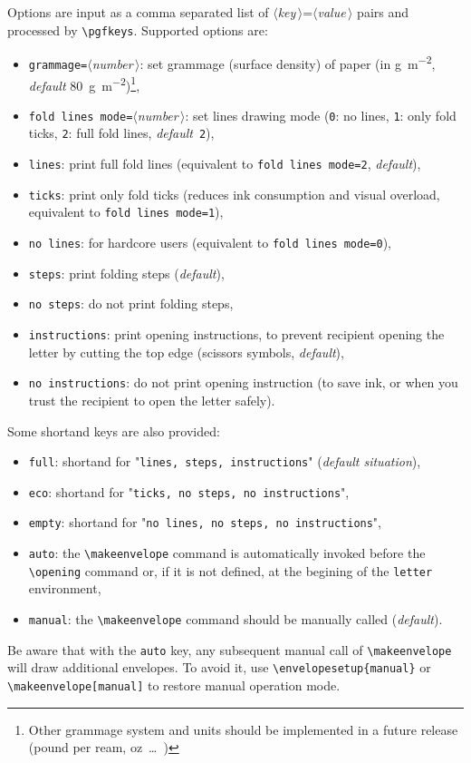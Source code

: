 \documentclass{article}
\newcommand{\optarg}[1]{$\langle$\textit{#1}\,$\rangle$}
\begin{document}
		Options are input as a comma separated list of \optarg{key}=\optarg{value} pairs and processed by \verb|\pgfkeys|. Supported options are:
		\begin{itemize}
			\item \verb|grammage=|\optarg{number}: set grammage (surface density) of paper (in \unit{\gram\per\square\meter}, \emph{default} \qty{80}{\gram\per\square\meter})\footnote{Other grammage system and units should be implemented in a future release (pound per ream, \unit{oz\per{}}\dots)},

			\item \verb|fold lines mode=|\optarg{number}: set lines drawing mode (\verb|0|: no lines, \verb|1|: only fold ticks, \verb|2|: full fold lines, \emph{default}~\verb|2|),
			\item \verb|lines|: print full fold lines (equivalent to \verb|fold lines mode=2|, \emph{default}),
			\item \verb|ticks|: print only fold ticks (reduces ink consumption and visual overload, equivalent to \verb|fold lines mode=1|),
			\item \verb|no lines|: for hardcore users (equivalent to \verb|fold lines mode=0|),

			\item \verb|steps|: print folding steps (\emph{default}),
			\item \verb|no steps|: do not print folding steps,

			\item \verb|instructions|: print opening instructions, to prevent recipient opening the letter by cutting the top edge (scissors symbols, \emph{default}),
			\item \verb|no instructions|: do not print opening instruction (to save ink, or when you trust the recipient to open the letter safely).
		\end{itemize}

		Some shortand keys are also provided:
		\begin{itemize}
			\item \verb|full|: shortand for "\verb|lines, steps, instructions|" (\emph{default situation}),
			\item \verb|eco|: shortand for "\verb|ticks, no steps, no instructions|",
			\item \verb|empty|: shortand for "\verb|no lines, no steps, no instructions|",
			\item \verb|auto|: the \verb|\makeenvelope| command is automatically invoked before the \verb|\opening| command or, if it is not defined, at the begining of the \verb|letter| environment,
			\item \verb|manual|: the \verb|\makeenvelope| command should be manually called (\emph{default}).
		\end{itemize}
		Be aware that with the \verb|auto| key, any subsequent manual call of \verb|\makeenvelope| will draw additional envelopes. To avoid it, use \verb|\envelopesetup{manual}| or \verb|\makeenvelope[manual]| to restore manual operation mode.
\end{document}
